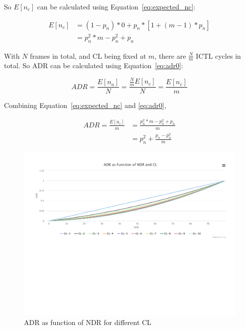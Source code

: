 \documentclass[12pt]{report}
\begin{document}
So $E[n_c]$ can be calculated using Equation~\ref{eq:expected_nc}:

\begin{equation}
  \begin{split}
    E[n_c] & = (1-p_n) * 0 + p_n * [1 + (m - 1) * p_n] \\
           & = p_n^2 * m - p_n^2 + p_n
  \end{split}
  \label{eq:expected_nc}
\end{equation}

With $N$ frames in total, and CL being fixed at $m$, there are $\frac{N}{m}$ ICTL cycles in total. So ADR can be calculated using Equation~\ref{eq:adr0}:

\begin{equation}
  ADR = \frac{E[n_a]}{N} = \frac{\frac{N}{m}E[n_c]}{N} = \frac{E[n_c]}{m}
  \label{eq:adr0}
\end{equation}

Combining Equation~\ref{eq:expected_nc} and \ref{eq:adr0},

\begin{equation}
  \begin{split}
    ADR = \frac{E[n_c]}{m} & = \frac{p_n^2*m-p_n^2+p_n}{m} \\
                           & = p_n^2 + \frac{p_n-p_n^2}{m}
  \end{split}
  \label{eq:adr}
\end{equation}

\begin{figure}[h]
  \begin{center}
    \includegraphics[width=\textwidth]{figures/adr.pdf}
    \caption{\label{fig:adr}ADR as function of NDR for different CL}
  \end{center}
\end{figure}
\end{document}
